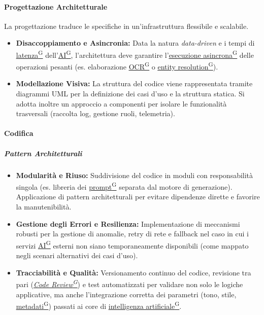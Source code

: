 \documentclass[a4paper,12pt]{article}
\providecommand{\glslink}[2]{\href{https://alittlebyte-19.github.io/Documentazione/glossario.html\#gls-#1}{\underline{#2}\textsuperscript{\scriptsize G}}}
\begin{document}
\paragraph{Progettazione Architetturale}
La progettazione traduce le specifiche in un'infrastruttura flessibile e scalabile.
\begin{itemize}
    \item \textbf{Disaccoppiamento e Asincronia:} Data la natura \textit{data-driven} e i tempi di \glslink{latenza}{latenza} dell'\glslink{intelligenza-artificiale-ai}{AI}, l'architettura deve garantire l'\glslink{esecuzione-asincrona}{esecuzione asincrona} delle operazioni pesanti (es. elaborazione \glslink{ocr-riconoscimento-ottico-dei-caratteri}{OCR} o \glslink{entity-resolution}{entity resolution}).
    \item \textbf{Modellazione Visiva:} La struttura del codice viene rappresentata tramite diagrammi UML per la definizione dei casi d'uso e la struttura statica. Si adotta inoltre un approccio a componenti per isolare le funzionalità trasversali (raccolta log, gestione ruoli, telemetria).

\end{itemize}

\paragraph{Codifica}

\subparagraph{Pattern Architetturali}
\begin{itemize}
    \item \textbf{Modularità e Riuso:} Suddivisione del codice in moduli con responsabilità singola (es. libreria dei \glslink{prompt}{prompt} separata dal motore di generazione). Applicazione di pattern architetturali per evitare dipendenze dirette e favorire la manutenibilità.
    \item \textbf{Gestione degli Errori e Resilienza:} Implementazione di meccanismi robusti per la gestione di anomalie, retry di rete e fallback nel caso in cui i servizi \glslink{intelligenza-artificiale-ai}{AI} esterni non siano temporaneamente disponibili (come mappato negli scenari alternativi dei casi d'uso).
    \item \textbf{Tracciabilità e Qualità:} Versionamento continuo del codice, revisione tra pari (\textit{\glslink{code-review}{Code Review}}) e test automatizzati per validare non solo le logiche applicative, ma anche l'integrazione corretta dei parametri (tono, stile, \glslink{metadati}{metadati}) passati ai core di \glslink{intelligenza-artificiale-ai}{intelligenza artificiale}.
\end{itemize}
\end{document}
